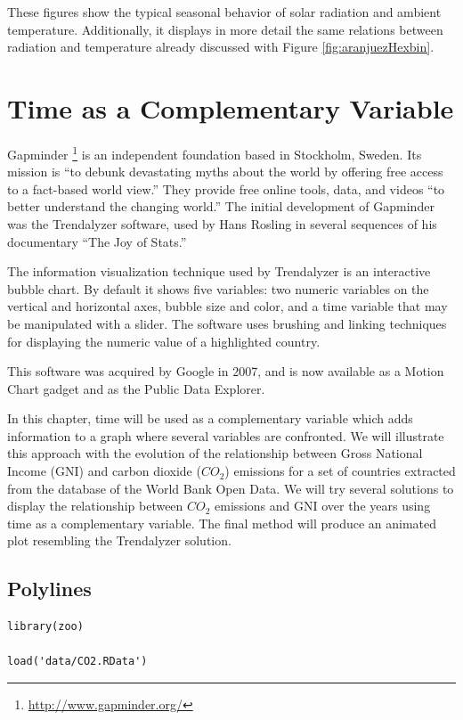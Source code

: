 \documentclass[smallroyalvopaper]{memoir}
\begin{document}
These figures show the typical seasonal behavior of solar radiation
and ambient temperature. Additionally, it displays in more detail the
same relations between radiation and temperature already discussed
with Figure \ref{fig:aranjuezHexbin}.

\chapter{Time as a Complementary Variable}
\label{sec:org4ab2de2}
\label{cha:timeComplementary}

Gapminder \footnote{\url{http://www.gapminder.org/}} is an independent foundation based in Stockholm, Sweden.  Its mission is ``to debunk devastating myths about the world by offering free access to a fact-based world view.'' They provide free online tools, data, and videos ``to better understand the changing world.'' The initial development of Gapminder was the Trendalyzer software, used by Hans Rosling in several sequences of his documentary ``The Joy of Stats.''

The information visualization technique used by Trendalyzer is an interactive bubble chart. By default it shows five variables: two numeric variables on the vertical and horizontal axes, bubble size and color, and a time variable that may be manipulated with a slider. The software uses brushing and linking techniques for displaying the numeric value of a highlighted country.

This software was acquired by Google in 2007, and is now available as a Motion Chart gadget and as the Public Data Explorer.

In this chapter, time will be used as a complementary variable which adds information to a graph where several variables are confronted. We will illustrate this approach with the evolution of the relationship between Gross National Income (GNI) and carbon dioxide (\(CO_2\)) emissions for a set of countries extracted from the database of the World Bank Open Data. We will try several solutions to display the relationship between \(CO_2\) emissions and GNI over the years using time as a complementary variable. The final method will produce an animated plot resembling the Trendalyzer solution.

\section{Polylines}
\label{sec:org9fde468}
\lstset{language=r,label= ,caption= ,captionpos=b,numbers=none}
\begin{lstlisting}
library(zoo)

load('data/CO2.RData')
\end{lstlisting}
\end{document}

